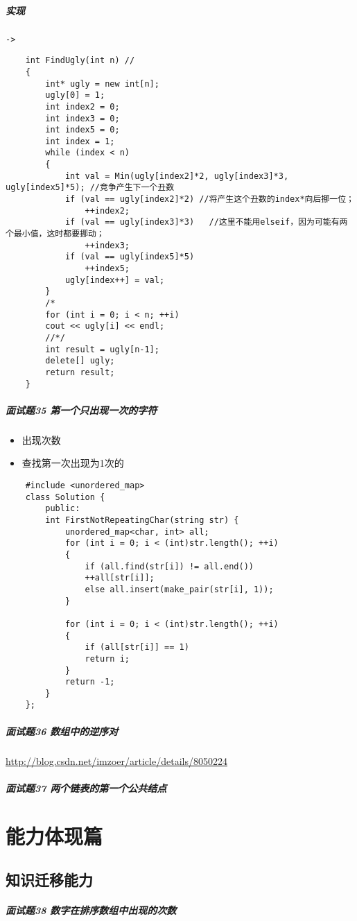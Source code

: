 \documentclass[UTF8,a4paper,12pt]{ctexbook}
\begin{document}
			\subparagraph{实现}\verb|->|
				\begin{lstlisting}
	int FindUgly(int n) //  
	{     
		int* ugly = new int[n];     
		ugly[0] = 1;     
		int index2 = 0;     
		int index3 = 0;     
		int index5 = 0;     
		int index = 1;     
		while (index < n)     
		{     
			int val = Min(ugly[index2]*2, ugly[index3]*3, ugly[index5]*5); //竞争产生下一个丑数     
			if (val == ugly[index2]*2) //将产生这个丑数的index*向后挪一位；    
				++index2;     
			if (val == ugly[index3]*3)   //这里不能用elseif，因为可能有两个最小值，这时都要挪动；  
				++index3;     
			if (val == ugly[index5]*5)     
				++index5;     
			ugly[index++] = val;     
		}     
		/* 
		for (int i = 0; i < n; ++i)    
		cout << ugly[i] << endl;    
		//*/  
		int result = ugly[n-1];     
		delete[] ugly;     
		return result;     
	}     			
				\end{lstlisting}
			\subparagraph{面试题35 第一个只出现一次的字符}
			
				\begin{itemize}[itemindent = 2em]
					\item 出现次数
					\item 查找第一次出现为1次的
				\end{itemize}
				\begin{lstlisting}
	#include <unordered_map>
	class Solution {
		public:
		int FirstNotRepeatingChar(string str) {
			unordered_map<char, int> all;
			for (int i = 0; i < (int)str.length(); ++i)
			{
				if (all.find(str[i]) != all.end())
				++all[str[i]];
				else all.insert(make_pair(str[i], 1));
			}
			
			for (int i = 0; i < (int)str.length(); ++i)
			{
				if (all[str[i]] == 1)
				return i;
			}
			return -1;
		}
	};			
				\end{lstlisting}
			\subparagraph{面试题36 数组中的逆序对}
				
				\url{http://blog.csdn.net/imzoer/article/details/8050224}
			
			\subparagraph{面试题37 两个链表的第一个公共结点}
	
	\section{能力体现篇}
		\subsection{知识迁移能力}
			\subparagraph{面试题38 数字在排序数组中出现的次数}
			
\end{document}
